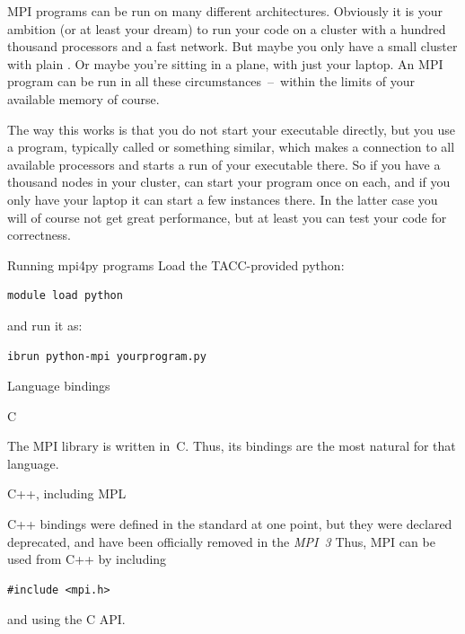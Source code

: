 MPI programs can be run on many different architectures. Obviously it
is your ambition (or at least your dream) to run your code on a
cluster with a hundred thousand processors and a fast network. But
maybe you only have a small cluster with
plain . Or maybe you're sitting in a plane, with
just your laptop. An MPI program can be run in all these
circumstances~--~within the limits of your available memory of course.

The way this works is that you do not start your executable directly,
but you use a program, typically called  or
something similar, which makes a connection to all available
processors and starts a run of your executable there. So if you have a
thousand nodes in your cluster,  can start your program once
on each, and if you only have your laptop it can start a few instances
there. In the latter case you will of course not get great
performance, but at least you can test your code for correctness.

\begin{tacc}
\begin{pythonnote}{Running mpi4py programs}
    Load the TACC-provided python:
\begin{verbatim}
module load python
\end{verbatim}
and run it as:
\begin{verbatim}
ibrun python-mpi yourprogram.py
\end{verbatim}
\end{pythonnote}
\end{tacc}

 {Language bindings}

 {C}

The MPI library is written in~C. Thus, its bindings are the most natural
for that language.


 {C++, including MPL}

C++ bindings were defined in the standard at one point,
but they were declared deprecated,
and have been officially removed in the \emph{MPI~3}%
Thus, MPI can be used from C++ by including
\begin{verbatim}
#include <mpi.h>
\end{verbatim}
and using the C API.

